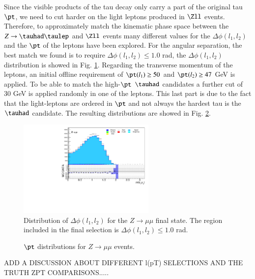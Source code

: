 Since the visible products of the tau decay only carry a part of the original tau $\pt$, we need to cut harder on the light leptons produced in $\Zll$ events. Therefore, to approximately match the kinematic phase space between the $Z\to\tauhad\taulep$ and $\Zll$ events many different values for the $\Delta\phi (l_1,l_2)$ and the $\pt$ of the leptons have been explored. For the angular separation, the best match we found is to require $\Delta\phi (l_1,l_2)\leq 1.0$ rad, the $\Delta\phi (l_1,l_2)$ distribution is showed in Fig. \ref{Fig8s}. Regarding the transverse momentum of the leptons, an initial offline requirement of $\pt(l_1)\geq 50$ and $\pt(l_2)\geq 47$ GeV is applied. To be able to match the high-$\pt$ $\tauhad$ candidates a further cut of 30 GeV is applied randomly in one of the leptons. This last part is due to the fact that the light-leptons are ordered in $\pt$ and not always the hardest tau is the $\tauhad$ candidate. The resulting distributions are showed in Fig. \ref{Fig9}.
\begin{figure}[htbp]	
	\centering
	\includegraphics[width=0.6\textwidth]{figures/Fig8.pdf}
	\caption{Distribution of $\Delta\phi (l_1,l_2)$ for the $Z\to\mu\mu$ final state. The region included in the final selection is $\Delta\phi (l_1,l_2)\leq 1.0$ rad.}
	\label{Fig8s}
\end{figure}
\begin{figure}[htbp]
	\centering
	\hfill
	\caption{$\pt$ distributions for $Z\to\mu\mu$ events.}
	\label{Fig9}
\end{figure}

ADD A DISCUSSION ABOUT DIFFERENT l(pT) SELECTIONS AND THE TRUTH ZPT COMPARISONS.....	 